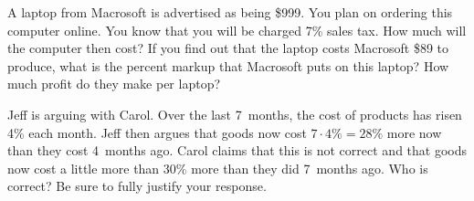 \documentclass[11pt,letterpaper]{article}
\begin{document}
	

\newpage



 A laptop from Macrosoft is advertised as being \$999. You plan on ordering this computer online. You know that you will be charged 7\% sales tax. How much will the computer then cost? If you find out that the laptop costs Macrosoft \$89 to produce, what is the percent markup that Macrosoft puts on this laptop? How much profit do they make per laptop? 



\newpage



 Jeff is arguing with Carol. Over the last 7~months, the cost of products has risen 4\% each month. Jeff then argues that goods now cost $7 \cdot 4\%= 28\%$ more now than they cost 4~months ago. Carol claims that this is not correct and that goods now cost a little more than 30\% more than they did 7~months ago. Who is correct? Be sure to fully justify your response. 
\end{document}
